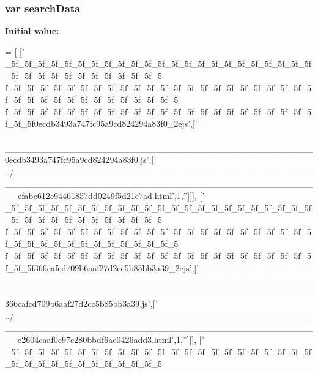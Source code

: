 \subsubsection[{search\+Data}]{\setlength{\rightskip}{0pt plus 5cm}var search\+Data}\label{files__0_8js_ad01a7523f103d6242ef9b0451861231e}
{\bfseries Initial value\+:}
\begin{DoxyCode}
=
[
  [\textcolor{stringliteral}{'
      \_5f\_5f\_5f\_5f\_5f\_5f\_5f\_5f\_5f\_5f\_5f\_5f\_5f\_5f\_5f\_5f\_5f\_5f\_5f\_5f\_5f\_5f\_5f\_5f\_5f\_5f\_5f\_5f\_5f\_5f\_5f\_5f\_5f\_5f\_5
      f\_5f\_5f\_5f\_5f\_5f\_5f\_5f\_5f\_5f\_5f\_5f\_5f\_5f\_5f\_5f\_5f\_5f\_5f\_5f\_5f\_5f\_5f\_5f\_5f\_5f\_5f\_5f\_5f\_5f\_5f\_5f\_5f\_5f\_5f\_5f\_5
      f\_5f\_5f\_5f\_5f\_5f\_5f\_5f\_5f\_5f\_5f\_5f\_5f\_5f\_5f\_5f\_5f\_5f\_5f\_5f\_5f\_5f\_5f\_5f\_5f\_5f0ecdb3493a747fc95a9cd824294a83f0\_2ejs'},[\textcolor{stringliteral}{'
      \_\_\_\_\_\_\_\_\_\_\_\_\_\_\_\_\_\_\_\_\_\_\_\_\_\_\_\_\_\_\_\_\_\_\_\_\_\_\_\_\_\_\_\_\_\_\_\_\_\_\_\_\_\_\_\_\_\_\_\_\_\_\_\_\_\_\_\_\_\_\_\_\_\_\_\_\_\_\_\_\_\_\_\_\_\_\_\_\_\_\_\_\_\_\_\_0ecdb3493a747fc95a9cd824294a83f0.js'},[\textcolor{stringliteral}{'
      ../\_\_\_\_\_\_\_\_\_\_\_\_\_\_\_\_\_\_\_\_\_\_\_\_\_\_\_\_\_\_\_\_\_\_\_\_\_\_\_\_\_\_\_\_\_\_\_\_\_\_\_\_\_\_\_\_\_\_\_\_\_\_\_\_\_\_\_\_\_\_\_\_\_\_\_\_\_\_\_\_\_\_\_\_\_\_\_\_\_\_\_\_\_\_\_\_efabc612e94461857dd0249f5d21e7ad.html'},1,\textcolor{stringliteral}{''}]]],
  [\textcolor{stringliteral}{'
      \_5f\_5f\_5f\_5f\_5f\_5f\_5f\_5f\_5f\_5f\_5f\_5f\_5f\_5f\_5f\_5f\_5f\_5f\_5f\_5f\_5f\_5f\_5f\_5f\_5f\_5f\_5f\_5f\_5f\_5f\_5f\_5f\_5f\_5f\_5
      f\_5f\_5f\_5f\_5f\_5f\_5f\_5f\_5f\_5f\_5f\_5f\_5f\_5f\_5f\_5f\_5f\_5f\_5f\_5f\_5f\_5f\_5f\_5f\_5f\_5f\_5f\_5f\_5f\_5f\_5f\_5f\_5f\_5f\_5f\_5f\_5
      f\_5f\_5f\_5f\_5f\_5f\_5f\_5f\_5f\_5f\_5f\_5f\_5f\_5f\_5f\_5f\_5f\_5f\_5f\_5f\_5f\_5f\_5f\_5f\_5f\_5f366cafcd709b6aaf27d2cc5b85bb3a39\_2ejs'},[\textcolor{stringliteral}{'
      \_\_\_\_\_\_\_\_\_\_\_\_\_\_\_\_\_\_\_\_\_\_\_\_\_\_\_\_\_\_\_\_\_\_\_\_\_\_\_\_\_\_\_\_\_\_\_\_\_\_\_\_\_\_\_\_\_\_\_\_\_\_\_\_\_\_\_\_\_\_\_\_\_\_\_\_\_\_\_\_\_\_\_\_\_\_\_\_\_\_\_\_\_\_\_\_366cafcd709b6aaf27d2cc5b85bb3a39.js'},[\textcolor{stringliteral}{'
      ../\_\_\_\_\_\_\_\_\_\_\_\_\_\_\_\_\_\_\_\_\_\_\_\_\_\_\_\_\_\_\_\_\_\_\_\_\_\_\_\_\_\_\_\_\_\_\_\_\_\_\_\_\_\_\_\_\_\_\_\_\_\_\_\_\_\_\_\_\_\_\_\_\_\_\_\_\_\_\_\_\_\_\_\_\_\_\_\_\_\_\_\_\_\_\_\_e2604caaf0c97c280bbdf6ae0426add3.html'},1,\textcolor{stringliteral}{''}]]],
  [\textcolor{stringliteral}{'
      \_5f\_5f\_5f\_5f\_5f\_5f\_5f\_5f\_5f\_5f\_5f\_5f\_5f\_5f\_5f\_5f\_5f\_5f\_5f\_5f\_5f\_5f\_5f\_5f\_5f\_5f\_5f\_5f\_5f\_5f\_5f\_5f\_5f\_5f\_5
}
\end{DoxyCode}

